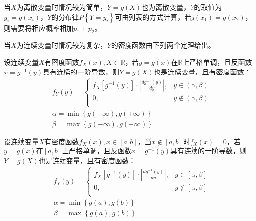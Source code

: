 当$X$为离散变量时情况较为简单，$Y=g\left( X \right) $也为离散变量，$Y$的取值为$y_i=g\left( x_i \right) $，$Y$的分布律$P\left\{ Y=y_i \right\} $可由列表的方式计算，若$g\left( x_1 \right) =g\left( x_2 \right) $，则需要将相应概率相加$p_1+p_2$。

当$X$为连续变量时情况较为复杂，$Y$的密度函数由下列两个定理给出。

\begin{theorem}
设连续变量$X$有密度函数$f_X\left( x \right) ,X\in \mathbb{R} $，若$y=g\left( x \right) $在$\mathbb{R} $上严格单调，且反函数$x=g^{-1}\left( y \right) $具有连续的一阶导数，则$Y=g\left( X \right) $也是连续变量，且有密度函数：
\begin{align*}
&f_Y\left( y \right) =\begin{cases}
	f_X\left[ g^{-1}\left( y \right) \right] \cdot \left| \frac{dg^{-1}\left( y \right)}{dy} \right|,&		y\in \left( \alpha ,\beta \right)\\
	0,&		y\notin \left( \alpha ,\beta \right)\\
\end{cases} \\
&\alpha =\min \left\{ g\left( -\infty \right) ,g\left( +\infty \right) \right\} \\
&\beta =\max \left\{ g\left( -\infty \right) ,g\left( +\infty \right) \right\}
\end{align*}
\end{theorem}

\begin{theorem}
设连续变量$X$有密度函数$f_X\left( x \right) ,x\in \left[ a,b \right] $，当$x\notin \left[ a,b \right] $时$f_X\left( x \right) =0$，若$y=g\left( x \right) $在$\left[ a,b \right] $上严格单调，且反函数$x=g^{-1}\left( y \right) $具有连续的一阶导数，则$Y=g\left( X \right) $也是连续变量，且有密度函数：
\begin{align*}
&f_Y\left( y \right) =\begin{cases}
	f_X\left[ g^{-1}\left( y \right) \right] \cdot \left| \frac{dg^{-1}\left( y \right)}{dy} \right|,&		y\in \left[ \alpha ,\beta \right]\\
	0,&		y\notin \left[ \alpha ,\beta \right]\\
\end{cases} \\
&\alpha =\min \left\{ g\left( a \right) ,g\left( b \right) \right\} \\
&\beta =\max \left\{ g\left( a \right) ,g\left( b \right) \right\}
\end{align*}
\end{theorem}

